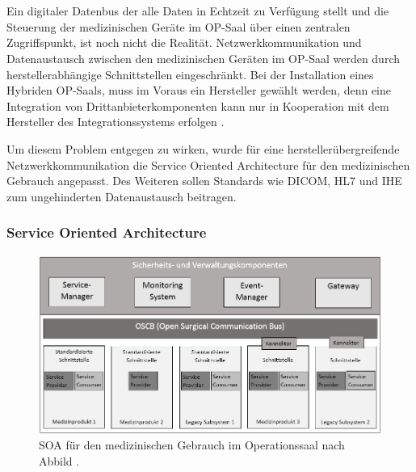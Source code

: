 \chapter{}
\label{sec:overview}

Ein digitaler Datenbus der alle Daten in Echtzeit zu Verfügung stellt und die Steuerung der medizinischen Geräte im OP-Saal über einen zentralen Zugriffspunkt, ist noch nicht die Realität. Netzwerkkommunikation und Datenaustausch zwischen den medizinischen Geräten im OP-Saal werden durch herstellerabhängige Schnittstellen eingeschränkt. Bei der Installation eines Hybriden OP-Saals, muss im Voraus ein Hersteller gewählt werden, denn \glqq eine Integration von Drittanbieterkomponenten kann nur in Kooperation mit dem Hersteller des Integrationssystems erfolgen\grqq{} \cite{DerDigitaleOperationssaal}.

Um diesem Problem entgegen zu wirken, wurde für eine herstellerübergreifende Netzwerkkommunikation die Service Oriented Architecture für den medizinischen Gebrauch angepasst. Des Weiteren sollen Standards wie DICOM, HL7 und IHE zum ungehinderten Datenaustausch beitragen.

\subsection{Service Oriented Architecture}

\begin{figure} [H]
	\includegraphics[scale = 0.6]{Content/Pictures/soa-red.png}
	\caption{SOA für den medizinischen Gebrauch im Operationssaal nach Abbild \cite{DerDigitaleOperationssaal}.}
	\label{fig:soa}
\end{figure}

